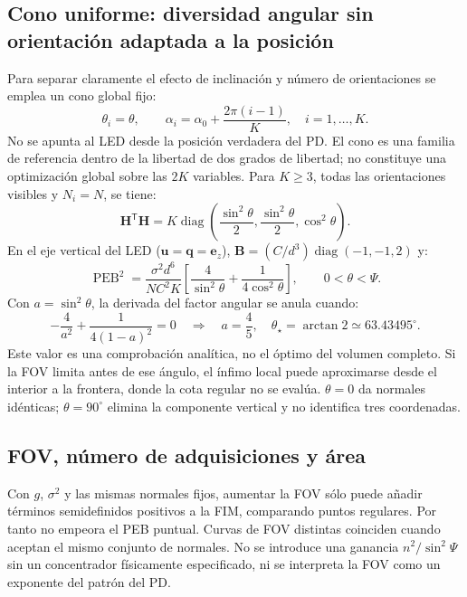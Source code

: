 \documentclass[11pt,a4paper]{article}
\newcommand{\PEB}{\operatorname{PEB}}
\begin{document}
\subsection{Cono uniforme: diversidad angular sin orientación adaptada a la posición}
Para separar claramente el efecto de inclinación y número de orientaciones se emplea un cono global fijo:
\begin{equation}
\theta_i=\theta,\qquad \alpha_i=\alpha_0+\frac{2\pi(i-1)}{K},\quad i=1,\ldots,K.
\label{eq:cone}
\end{equation}
No se apunta al LED desde la posición verdadera del PD. El cono es una familia de referencia dentro de la libertad de dos grados de libertad; no constituye una optimización global sobre las $2K$ variables. Para $K\geq3$, todas las orientaciones visibles y $N_i=N$, se tiene:
\begin{equation}
\mathbf H^{\mathsf T}\mathbf H=K\operatorname{diag}\left(\frac{\sin^2\theta}{2},\frac{\sin^2\theta}{2},\cos^2\theta\right).
\label{eq:conegram}
\end{equation}
En el eje vertical del LED ($\mathbf u=\mathbf q=\mathbf e_z$), $\mathbf B=(C/d^3)\operatorname{diag}(-1,-1,2)$ y:
\begin{equation}
\PEB^2=\frac{\sigma^2 d^6}{N C^2 K}\left[\frac{4}{\sin^2\theta}+\frac{1}{4\cos^2\theta}\right],\qquad 0<\theta<\Psi.
\label{eq:axis}
\end{equation}
Con $a=\sin^2\theta$, la derivada del factor angular se anula cuando:
\begin{equation}
-\frac4{a^2}+\frac1{4(1-a)^2}=0
\quad\Longrightarrow\quad a=\frac45,\quad
\theta_\star=\arctan2\simeq63.43495^\circ.
\label{eq:axisopt}
\end{equation}
Este valor es una comprobación analítica, no el óptimo del volumen completo. Si la FOV limita antes de ese ángulo, el ínfimo local puede aproximarse desde el interior a la frontera, donde la cota regular no se evalúa. $\theta=0$ da normales idénticas; $\theta=90^\circ$ elimina la componente vertical y no identifica tres coordenadas.

\subsection{FOV, número de adquisiciones y área}
Con $g$, $\sigma^2$ y las mismas normales fijos, aumentar la FOV sólo puede añadir términos semidefinidos positivos a la FIM, comparando puntos regulares. Por tanto no empeora el PEB puntual. Curvas de FOV distintas coinciden cuando aceptan el mismo conjunto de normales. No se introduce una ganancia $n^2/\sin^2\Psi$ sin un concentrador físicamente especificado, ni se interpreta la FOV como un exponente del patrón del PD.
\end{document}
